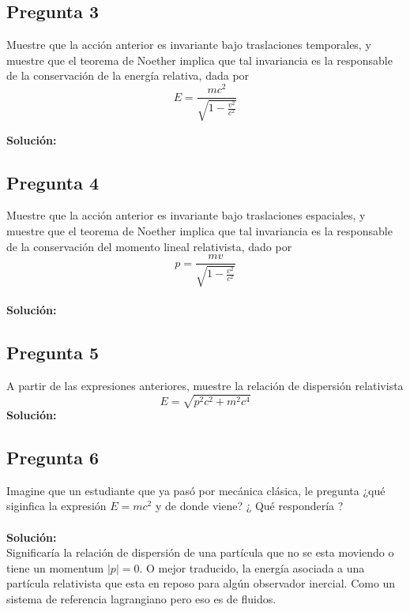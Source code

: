 \documentclass[../main_ej.tex]{subfiles}
\begin{document}
\subsection{Pregunta 3}
Muestre que la acción anterior es invariante bajo traslaciones temporales, y muestre que el teorema de Noether implica que tal invariancia es la responsable de la conservación de la energía relativa, dada por
\begin{equation}
  E=\frac{mc^2}{\sqrt{1-\frac{v^2}{c^2}}}
\end{equation}  

\textbf{Solución:}
\\  

\subsection{Pregunta 4}
Muestre que la acción anterior es invariante bajo traslaciones espaciales, y muestre que el teorema de Noether implica que tal invariancia es la responsable de la conservación del momento lineal relativista, dado por
\begin{equation}
  p=\frac{mv}{\sqrt{1-\frac{v^2}{c^2}}}
\end{equation}
\\
\textbf{Solución:} 
\\
\subsection{Pregunta 5}
A partir de las expresiones anteriores, muestre la relación de dispersión relativista
\begin{equation}
  E=\sqrt{p^2c^2+m^2c^4}
\end{equation}
\textbf{Solución:}
\\
\subsection{Pregunta 6}
Imagine que un estudiante que ya pasó por mecánica clásica, le pregunta ¿qué siginfica la expresión $E=mc^2$ y de donde viene? ¿ Qué respondería ?  \\
\\
\textbf{Solución:}
\\

Significaría la relación de dispersión de una partícula que no se esta moviendo o tiene un momentum $|p|=0$. O mejor traducido, la energía asociada a una partícula relativista que esta en reposo para algún observador inercial. Como un sistema de referencia lagrangiano pero eso es de fluidos. 



 
\end{document}
